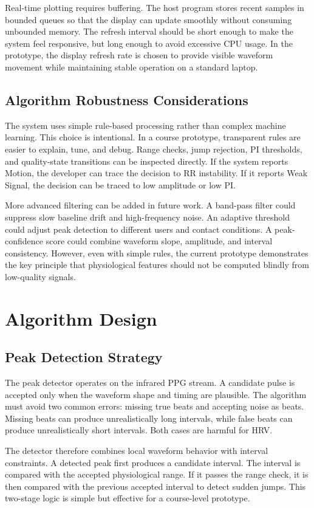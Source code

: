 \documentclass[10pt,conference]{IEEEtran}
\begin{document}
Real-time plotting requires buffering. The host program stores recent samples in bounded queues so that the display can update smoothly without consuming unbounded memory. The refresh interval should be short enough to make the system feel responsive, but long enough to avoid excessive CPU usage. In the prototype, the display refresh rate is chosen to provide visible waveform movement while maintaining stable operation on a standard laptop.

\subsection{Algorithm Robustness Considerations}
The system uses simple rule-based processing rather than complex machine learning. This choice is intentional. In a course prototype, transparent rules are easier to explain, tune, and debug. Range checks, jump rejection, PI thresholds, and quality-state transitions can be inspected directly. If the system reports Motion, the developer can trace the decision to RR instability. If it reports Weak Signal, the decision can be traced to low amplitude or low PI.

More advanced filtering can be added in future work. A band-pass filter could suppress slow baseline drift and high-frequency noise. An adaptive threshold could adjust peak detection to different users and contact conditions. A peak-confidence score could combine waveform slope, amplitude, and interval consistency. However, even with simple rules, the current prototype demonstrates the key principle that physiological features should not be computed blindly from low-quality signals.

\section{Algorithm Design}
\subsection{Peak Detection Strategy}
The peak detector operates on the infrared PPG stream. A candidate pulse is accepted only when the waveform shape and timing are plausible. The algorithm must avoid two common errors: missing true beats and accepting noise as beats. Missing beats can produce unrealistically long intervals, while false beats can produce unrealistically short intervals. Both cases are harmful for HRV.

The detector therefore combines local waveform behavior with interval constraints. A detected peak first produces a candidate interval. The interval is compared with the accepted physiological range. If it passes the range check, it is then compared with the previous accepted interval to detect sudden jumps. This two-stage logic is simple but effective for a course-level prototype.
\end{document}
